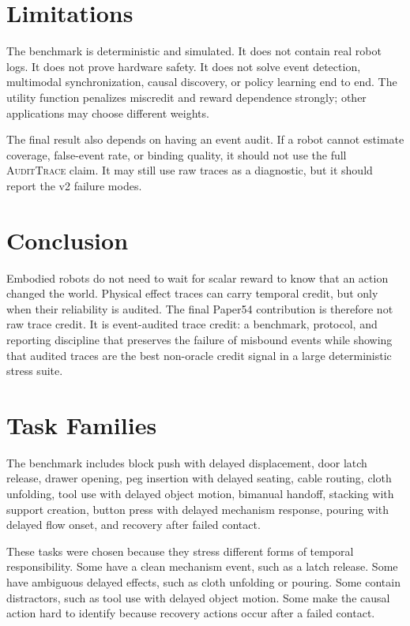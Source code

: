 \documentclass{article}
\newcommand{\method}{\textsc{AuditTrace}\xspace}
\begin{document}
\section{Limitations}

The benchmark is deterministic and simulated. It does not contain real robot logs. It does not prove hardware safety. It does not solve event detection, multimodal synchronization, causal discovery, or policy learning end to end. The utility function penalizes miscredit and reward dependence strongly; other applications may choose different weights.

The final result also depends on having an event audit. If a robot cannot estimate coverage, false-event rate, or binding quality, it should not use the full \method claim. It may still use raw traces as a diagnostic, but it should report the v2 failure modes.

\section{Conclusion}

Embodied robots do not need to wait for scalar reward to know that an action changed the world. Physical effect traces can carry temporal credit, but only when their reliability is audited. The final Paper54 contribution is therefore not raw trace credit. It is event-audited trace credit: a benchmark, protocol, and reporting discipline that preserves the failure of misbound events while showing that audited traces are the best non-oracle credit signal in a large deterministic stress suite.

\appendix
\renewcommand{\thesection}{\arabic{section}}

\section{Task Families}

The benchmark includes block push with delayed displacement, door latch release, drawer opening, peg insertion with delayed seating, cable routing, cloth unfolding, tool use with delayed object motion, bimanual handoff, stacking with support creation, button press with delayed mechanism response, pouring with delayed flow onset, and recovery after failed contact.

These tasks were chosen because they stress different forms of temporal responsibility. Some have a clean mechanism event, such as a latch release. Some have ambiguous delayed effects, such as cloth unfolding or pouring. Some contain distractors, such as tool use with delayed object motion. Some make the causal action hard to identify because recovery actions occur after a failed contact.
\end{document}
